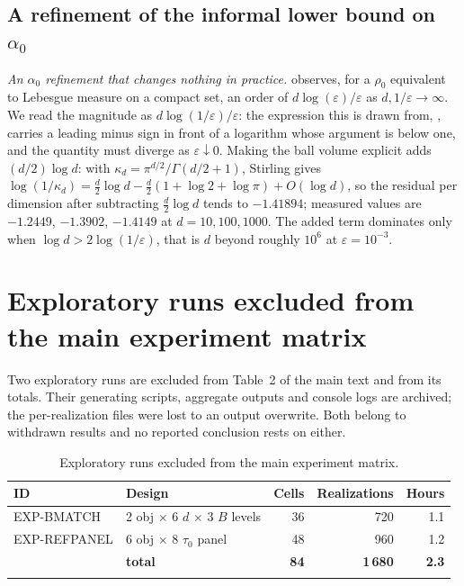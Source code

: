 \documentclass[sn-mathphys-num]{sn-jnl}
\theoremstyle{plain}
\theoremstyle{remark}
\begin{document}
\subsection{A refinement of the informal lower bound on $\alpha_0$}
\emph{An $\alpha_0$ refinement that changes nothing in practice.} \cite[Section 3.3]{fkr2024} observes, for a $\rho_0$ equivalent to Lebesgue measure on a compact set, an order of $d\log(\varepsilon)/\varepsilon$ as $d,1/\varepsilon\to\infty$. We read the magnitude as $d\log(1/\varepsilon)/\varepsilon$: the expression this is drawn from, \cite[Remark 4.8]{fkr2024}, carries a leading minus sign in front of a logarithm whose argument is below one, and the quantity must diverge as $\varepsilon\downarrow0$. Making the ball volume explicit adds $(d/2)\log d$: with $\kappa_d=\pi^{d/2}/\Gamma(d/2+1)$, Stirling gives $\log(1/\kappa_d)=\frac d2\log d-\frac d2(1+\log2+\log\pi)+O(\log d)$, so the residual per dimension after subtracting $\frac d2\log d$ tends to $-1.41894$; measured values are $-1.2449$, $-1.3902$, $-1.4149$ at $d=10,100,1000$. The added term dominates only when $\log d>2\log(1/\varepsilon)$, that is $d$ beyond roughly $10^6$ at $\varepsilon=10^{-3}$.



\section{Exploratory runs excluded from the main experiment matrix}\label{S1b}
Two exploratory runs are excluded from Table~2 of the main text and from its totals. Their generating scripts, aggregate outputs and console logs are archived; the per-realization files were lost to an output overwrite. Both belong to withdrawn results and no reported conclusion rests on either.

\begin{table}[h]
\caption{Exploratory runs excluded from the main experiment matrix.}\label{tabS1}
\begin{tabular}{@{}llrrr@{}}
\toprule
ID & Design & Cells & Realizations & Hours\\
\midrule
EXP-BMATCH & 2 obj $\times$ 6 $d$ $\times$ 3 $B$ levels & 36 & 720 & 1.1\\
EXP-REFPANEL & 6 obj $\times$ 8 $\tau_0$ panel & 48 & 960 & 1.2\\
\midrule
& \textbf{total} & \textbf{84} & \textbf{1\,680} & \textbf{2.3}\\
\botrule
\end{tabular}
\end{table}
\end{document}
